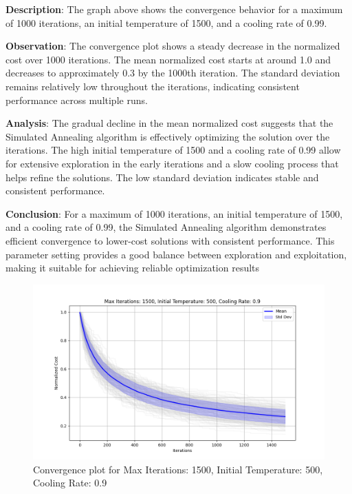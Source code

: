 \documentclass{article}
\begin{document}
    \textbf{Description}: The graph above shows the convergence behavior for a maximum of 1000 iterations, an initial temperature of 1500, and a cooling rate of 0.99.

    \textbf{Observation}: The convergence plot shows a steady decrease in the normalized cost over 1000 iterations. The mean normalized cost starts at around 1.0 and decreases to approximately 0.3 by the 1000th iteration. The standard deviation remains relatively low throughout the iterations, indicating consistent performance across multiple runs.

    \textbf{Analysis}: The gradual decline in the mean normalized cost suggests that the Simulated Annealing algorithm is effectively optimizing the solution over the iterations. The high initial temperature of 1500 and a cooling rate of 0.99 allow for extensive exploration in the early iterations and a slow cooling process that helps refine the solutions. The low standard deviation indicates stable and consistent performance.

    \textbf{Conclusion}: For a maximum of 1000 iterations, an initial temperature of 1500, and a cooling rate of 0.99, the Simulated Annealing algorithm demonstrates efficient convergence to lower-cost solutions with consistent performance. This parameter setting provides a good balance between exploration and exploitation, making it suitable for achieving reliable optimization results

    \begin{figure}[H]
        \centering
        \includegraphics[width=\textwidth]{simulated_annealing/max_iter_1500_init_temp_500_cooling_rate_0.9}
        \caption{Convergence plot for Max Iterations: 1500, Initial Temperature: 500, Cooling Rate: 0.9}
        \label{fig:sa_1500_500_0.9}
    \end{figure}
\end{document}
